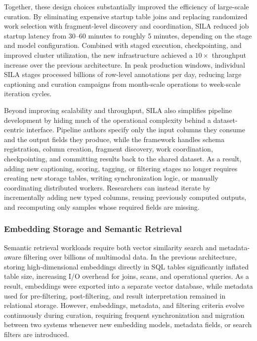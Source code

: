 \documentclass{llmxive}
\begin{document}
Together, these design choices substantially improved the efficiency of large-scale curation. By eliminating expensive startup table joins and replacing randomized work selection with fragment-level discovery and coordination, SILA reduced job startup latency from 30--60 minutes to roughly 5 minutes, depending on the stage and model configuration. Combined with staged execution, checkpointing, and improved cluster utilization, the new infrastructure achieved a $10\times$ throughput increase over the previous architecture. In peak production windows, individual SILA stages processed billions of row-level annotations per day, reducing large captioning and curation campaigns from month-scale operations to week-scale iteration cycles.

Beyond improving scalability and throughput, SILA also simplifies pipeline development by hiding much of the operational complexity behind a dataset-centric interface. Pipeline authors specify only the input columns they consume and the output fields they produce, while the framework handles schema registration, column creation, fragment discovery, work coordination, checkpointing, and committing results back to the shared dataset. As a result, adding new captioning, scoring, tagging, or filtering stages no longer requires creating new storage tables, writing synchronization logic, or manually coordinating distributed workers. Researchers can instead iterate by incrementally adding new typed columns, reusing previously computed outputs, and recomputing only samples whose required fields are missing.

\subsubsection{Embedding Storage and Semantic Retrieval}

Semantic retrieval workloads require both vector similarity search and metadata-aware filtering over billions of multimodal data. In the previous architecture, storing high-dimensional embeddings directly in SQL tables significantly inflated table size, increasing I/O overhead for joins, scans, and operational queries. As a result, embeddings were exported into a separate vector database, while metadata used for pre-filtering, post-filtering, and result interpretation remained in relational storage. However, embeddings, metadata, and filtering criteria evolve continuously during curation, requiring frequent synchronization and migration between two systems whenever new embedding models, metadata fields, or search filters are introduced.
\end{document}
